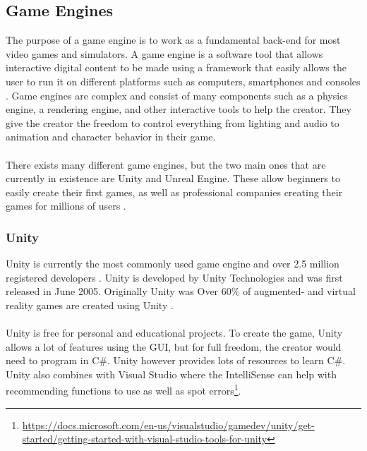 \subsection{Game Engines} \label{GameEngines}
The purpose of a game engine is to work as a fundamental back-end for most video games and simulators. A game engine is a software tool that allows interactive digital content to be made using a framework that easily allows the user to run it on different platforms such as computers, smartphones and consoles \cite{GameEngine_UnityGame_book}. Game engines are complex and consist of many components such as a physics engine, a rendering engine, and other interactive tools to help the creator. They give the creator the freedom to control everything from lighting and audio to animation and character behavior in their game.
\\~\\
There exists many different game engines, but the two main ones that are currently in existence are Unity and Unreal Engine. These allow beginners to easily create their first games, as well as professional companies creating their games for millions of users \cite{GamesMadeInUnity, GamesMadeInUnrealEngine}.

\subsubsection{Unity}
Unity is currently the most commonly used game engine and over 2.5 million registered developers \cite{Unity_arnia_software}. Unity is developed by Unity Technologies and was first released in June 2005.  Originally Unity was Over 60\% of augmented- and virtual reality games are created using Unity  \cite{GameEngine_UnityGame_book}. 
\\~\\
Unity is free for personal and educational projects. To create the game, Unity allows a lot of features using the GUI, but for full freedom, the creator would need to program in C\#. Unity however provides lots of resources to learn C\#. Unity also combines with Visual Studio where the IntelliSense can help with recommending functions to use as well as spot errors\footnote{\url{https://docs.microsoft.com/en-us/visualstudio/gamedev/unity/get-started/getting-started-with-visual-studio-tools-for-unity}}.

